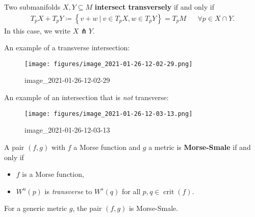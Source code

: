 \begin{definition}

Two submanifolds \(X, Y \subseteq M\) \textbf{intersect transversely} if
and only if
\begin{align*}
T_pX + T_p Y \coloneqq\left\{{v+w{~\mathrel{\Big|}~}v\in T_p X, w\in T_p Y}\right\} = T_p M && \forall p\in X \cap Y
.\end{align*}
In this case, we write \(X \pitchfork Y\).

\end{definition}

\begin{example}[?]

An example of a transverse intersection:

\begin{figure}
\centering
\texttt{[image: figures/image\_2021-01-26-12-02-29.png]}
\caption{image\_2021-01-26-12-02-29}
\end{figure}

\end{example}

\begin{example}[?]

An example of an intersection that is \emph{not} transverse:

\begin{figure}
\centering
\texttt{[image: figures/image\_2021-01-26-12-03-13.png]}
\caption{image\_2021-01-26-12-03-13}
\end{figure}

\end{example}

\begin{definition}

A pair \((f, g)\) with \(f\) a Morse function and \(g\) a metric is
\textbf{Morse-Smale} if and only if

\begin{itemize}
\tightlist
\item
  \(f\) is a Morse function,
\item
  \(W^u(p)\) is \emph{transverse} to \(W^s(q)\) for all
  \(p, q\in \operatorname{crit}(f)\).
\end{itemize}

\end{definition}

\begin{theorem}[?]

For a generic metric \(g\), the pair \((f, g)\) is Morse-Smale.

\end{theorem}

